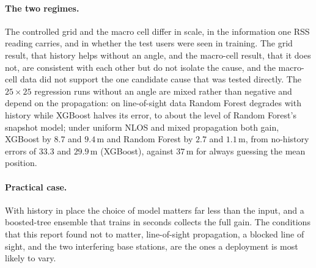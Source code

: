 \paragraph{The two regimes.}
The controlled grid and the macro cell differ in scale, in the information one RSS reading carries, and in whether the test users were seen in training. The grid result, that history helps without an angle, and the macro-cell result, that it does not, are consistent with each other but do not isolate the cause, and the macro-cell data did not support the one candidate cause that was tested directly. The $25\times25$ regression runs without an angle are mixed rather than negative and depend on the propagation: on line-of-sight data Random Forest degrades with history while XGBoost halves its error, to about the level of Random Forest's snapshot model; under uniform NLOS and mixed propagation both gain, XGBoost by $8.7$ and $9.4\,\text{m}$ and Random Forest by $2.7$ and $1.1\,\text{m}$, from no-history errors of $33.3$ and $29.9\,\text{m}$ (XGBoost), against $37\,\text{m}$ for always guessing the mean position.

\paragraph{Practical case.}
With history in place the choice of model matters far less than the input, and a boosted-tree ensemble that trains in seconds collects the full gain. The conditions that this report found not to matter, line-of-sight propagation, a blocked line of sight, and the two interfering base stations, are the ones a deployment is most likely to vary.
